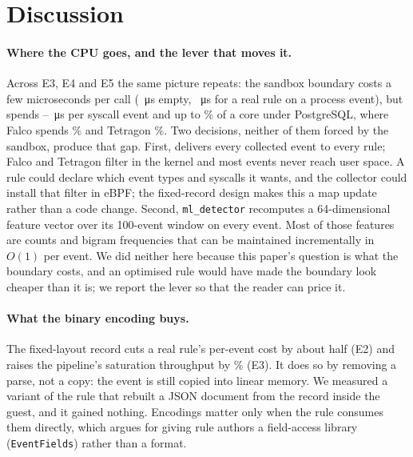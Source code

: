 \section{Discussion}
\label{sec:discussion}

\paragraph{Where the CPU goes, and the lever that moves it.}
Across E3, E4 and E5 the same picture repeats: the sandbox boundary costs
a few microseconds per call (\eTwoEngineOverheadUs{}~\si{\micro\second}
empty, \eTwoMlRawUs{}~\si{\micro\second} for a real rule on a process
event), but \sys spends \eThreeDetectPFiftyBinTenKRf{}--\eThreeDetectPFiftyJsonOneKRf{}~\si{\micro\second}
per syscall event and up to \eFourCpuPgWs{}\% of a core under PostgreSQL,
where Falco spends \eFourCpuPgFalco{}\% and Tetragon \eFourCpuPgTetragon{}\%.
Two decisions, neither of them forced by the sandbox, produce that gap.
First, \sys delivers every collected event to every rule; Falco and
Tetragon filter in the kernel and most events never reach user space. A
rule could declare which event types and syscalls it wants, and the
collector could install that filter in eBPF; the fixed-record design makes
this a map update rather than a code change. Second,
\texttt{ml\_detector} recomputes a 64-dimensional feature vector over its
100-event window on every event. Most of those features are counts and
bigram frequencies that can be maintained incrementally in $O(1)$ per
event. We did neither here because this paper's question is what the
boundary costs, and an optimised rule would have made the boundary look
cheaper than it is; we report the lever so that the reader can price it.

\paragraph{What the binary encoding buys.}
The fixed-layout record cuts a real rule's per-event cost by about half
(E2) and raises the pipeline's saturation throughput by
\eThreeBinGainPctRf{}\% (E3). It does so by removing a parse, not a copy:
the event is still copied into linear memory. We measured a variant of the
rule that rebuilt a JSON document from the record inside the guest, and
it gained nothing. Encodings matter only when the rule consumes them
directly, which argues for giving rule authors a field-access library
(\texttt{EventFields}) rather than a format.

